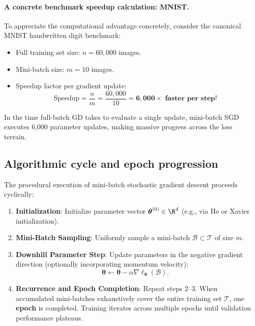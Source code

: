 \paragraph{A concrete benchmark speedup calculation: MNIST.}
To appreciate the computational advantage concretely, consider the canonical MNIST handwritten digit benchmark:
\begin{itemize}[noitemsep]
  \item Full training set size: $n = 60{,}000$ images.
  \item Mini-batch size: $m = 10$ images.
  \item Speedup factor per gradient update:
  \begin{equation}
  \text{Speedup} = \frac{n}{m} = \frac{60{,}000}{10} = \mathbf{6{,}000 \times \text{ faster per step!}}
  \end{equation}
\end{itemize}
In the time full-batch GD takes to evaluate a single update, mini-batch SGD executes 6,000 parameter updates, making massive progress across the loss terrain.

\subsection{Algorithmic cycle and epoch progression}
\label{sec:algorithmic_cycle_epochs}

The procedural execution of mini-batch stochastic gradient descent proceeds cyclically:
\begin{enumerate}
  \item \textbf{Initialization}: Initialize parameter vector $\boldsymbol{\theta}^{(0)} \in \R^d$ (e.g., via He or Xavier initialization).
  \item \textbf{Mini-Batch Sampling}: Uniformly sample a mini-batch $\mathcal{B} \subset \mathcal{T}$ of size $m$.
  \item \textbf{Downhill Parameter Step}: Update parameters in the negative gradient direction (optionally incorporating momentum velocity):
    \begin{equation}
    \boldsymbol{\theta} \leftarrow \boldsymbol{\theta} - \alpha \nabla \ell_{\boldsymbol{\theta}}(\mathcal{B}).
    \label{eq:minibatch_algorithmic_step}
    \end{equation}
  \item \textbf{Recurrence and Epoch Completion}: Repeat steps 2--3. When accumulated mini-batches exhaustively cover the entire training set $\mathcal{T}$, one \textbf{epoch} is completed. Training iterates across multiple epochs until validation performance plateaus.
\end{enumerate}

